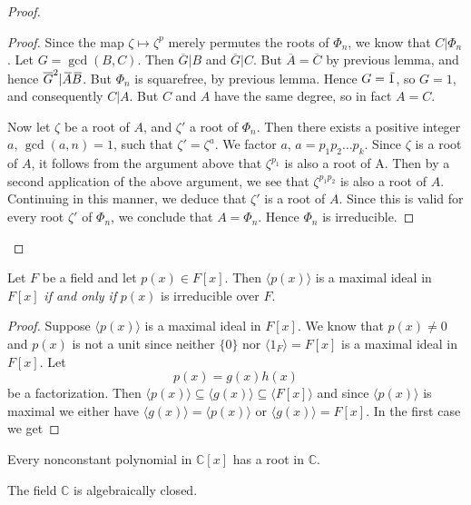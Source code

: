 \begin{proof}
\begin{proof}
        Since the map $\zeta \mapsto \zeta^p$ merely permutes the roots of
        $\Phi_n$, we know that $C|\Phi_n$. Let $G = \gcd(B,C)$. Then $\overline{G}|B$ and $\overline{G}|C$. But $\overline{A} = \overline{C}$ by previous lemma,
        and hence $\overline{G}^2 | \,\overline{\!{A}} \,\overline{\!{B}}$. But $\Phi_n$ is squarefree, by previous lemma. Hence $G = \,\overline{\!{1}}$, so $G = 1$,
        and consequently $C |A$. But $C$ and $A$ have the same degree, so in fact $A = C$.
        
        Now let $\zeta$ be a root of $A$, and $\zeta'$ a root of $\Phi_n$. Then there exists a positive integer $a$,
        $\gcd(a, n) = 1$, such that $\zeta' = \zeta^a$. We factor $a$, $a = p_1p_2 \ldots p_k$. Since $\zeta$ is a root of $A$, it follows
        from the argument above that $\zeta^{p_1}$ is also a root of A. Then by a second application of
        the above argument, we see that $\zeta^{p_1p_2}$ is also a root of $A$. Continuing in this manner, we
        deduce that $\zeta'$ is a root of $A$. Since this is valid for every root $\zeta'$ of $\Phi_n$, we conclude that
        $A = \Phi_n$. Hence $\Phi_n$ is irreducible.
    \end{proof}
\end{proof}



\begin{theorem}
    Let $F$ be a field and let $p(x) \in F[x]$. Then $\langle p(x) \rangle$ is a maximal ideal in $F[x]$
    \textit{if and only if} $p(x)$ is irreducible over $F$.
\end{theorem}
\begin{proof}
    Suppose $\langle p(x) \rangle$ is a maximal ideal in $F[x]$. We know that $p(x) \neq 0$ and 
    $p(x)$ is not a unit since neither $\{ 0 \}$ nor $\langle 1_F \rangle = F[x]$ is a 
    maximal ideal in $F[x]$. Let 
    \[
        p(x) = g(x) h(x)
    \]
    be a factorization. Then $\langle p(x) \rangle \subseteq \langle g(x) \rangle 
    \subseteq \langle F[x] \rangle$ and since $\langle p(x) \rangle$ is maximal we either have 
    $\langle g(x) \rangle = \langle p(x) \rangle$ or $\langle g(x) \rangle = F[x]$. In the 
    first case we get 
\end{proof}

\begin{theorem}
    Every nonconstant polynomial in $\mathbb{C}[x]$ has a root in $\mathbb{C}$.
\end{theorem}
\begin{remark}
    The field $\mathbb{C}$ is algebraically closed.
\end{remark}

